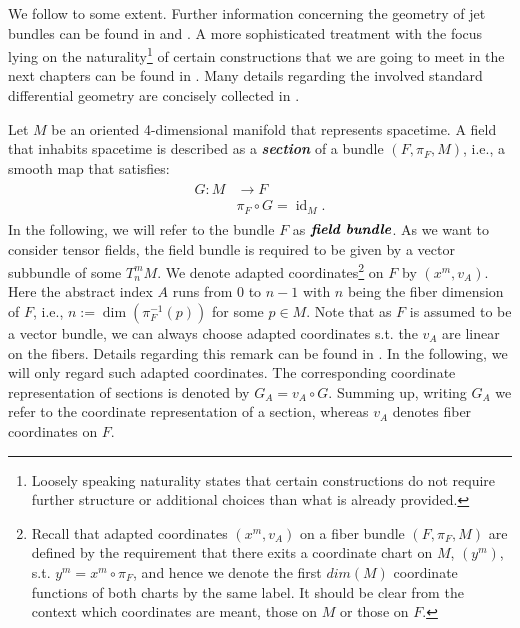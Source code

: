 We follow \cite{1998physics...1019G} to some extent. Further information concerning the geometry of jet bundles can be found in \cite{saunders_1989} and \cite{seiler2009involution}. A more sophisticated treatment with the focus lying on the naturality\footnote{Loosely speaking naturality states that certain constructions do not require further structure or additional choices than what is already provided.} of certain constructions that we are going to meet in the next chapters can be found in \cite{kolar1993natural}. Many details regarding the involved standard differential geometry are concisely collected in \cite{doi:10.1142/3867}.

Let $M$ be an oriented 4-dimensional manifold that represents spacetime. A field that inhabits spacetime is described as a \textit{\textbf{section}} of a bundle $(F,\pi_F,M)$, i.e., a smooth map that satisfies:
\begin{align}
\begin{aligned}
G : M &\longrightarrow F\\
& \pi_F \circ G = \operatorname{id}_M.
\end{aligned}
\end{align}
In the following, we will refer to the bundle $F$ as $\textit{\textbf{field bundle}}$.  As we want to consider tensor fields, the field bundle is required to be given by a vector subbundle of some $T^m_n M$. We denote adapted coordinates\footnote{Recall that adapted coordinates $(x^m,v_A)$ on a fiber bundle $(F, \pi_F, M)$ are defined by the requirement that there exits a coordinate chart on $M$, $(y^m)$, s.t. $y^m = x^m \circ \pi_F$, and hence we denote the first $dim(M)$ coordinate functions of both charts by the same label. It should be clear from the context which coordinates are meant, those on $M$ or those on $F$.} on $F$ by $(x^m,v_A)$. Here the abstract index $A$ runs from $0$ to $n - 1$ with $n$ being the fiber dimension of $F$, i.e., $n := \operatorname{dim}(\pi_F^{-1}(p))$ for some $p \in M$. Note that as $F$ is assumed to be a vector bundle, we can always choose adapted coordinates s.t. the $v_A$ are linear on the fibers. Details regarding this remark can be found in \cite{saunders_1989}. In the following, we will only regard such adapted coordinates. The corresponding coordinate representation of sections is denoted by $G_A = v_A \circ G $. Summing up, writing $G_A$ we refer to the coordinate representation of a section, whereas $v_A$ denotes fiber coordinates on $F$.

